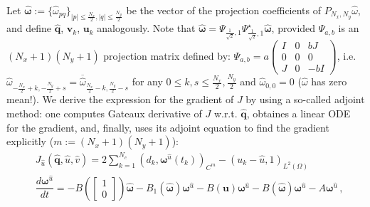 \documentclass[onecolumn, 12pt, conference]{ieeeconf}
\newcommand{\Lt}{L^2(\Omega)}
\begin{document}
Let $\hat{\bm\omega}:=\{\hat\omega_{pq}\}_{|p|\le\frac{N_x}2,|q|\le\frac{N_y}2}$ be the vector of the projection coefficients of $P_{N_x,N_y}\hat\omega$, and define $\hat{\bm q}$, $\bm{v}_k$, $\bm{u}_k$ analogously. Note that $\hat{\bm\omega} = \Psi_{\frac1{\sqrt{2}},1} \Psi_{\frac1{\sqrt{2}},1}^\star\hat{\bm\omega}$, provided $\Psi_{a,b}$ is an $(N_x+1)(N_y+1)$ projection matrix defined by: $\Psi_{a,b}=
a\left( \begin{smallmatrix}
I&0&bJ\\0&0&0\\ J&0&-bI
\end{smallmatrix}
\right)$, i.e. $\hat{\omega}_{-\frac{N_x}2+k,-\frac{N_y}2+s}=\overline{\hat \omega}_{\frac{N_x}2-k,\frac{N_y}2-s}$ for any $0\le k,s\le \frac{N_x}2,\frac{N_y}2$ and $\hat{\omega}_{0,0}=0$ ($\hat\omega$ has zero mean!).
We derive the expression for the gradient of $J$ by using a so-called adjoint method: one computes Gateaux derivative of $J$ w.r.t. $\hat{\bm q}$, obtaines a linear ODE for the gradient, and, finally, uses its adjoint equation to find the gradient explicitly ($m:=(N_x+1)(N_y+1)$):
\[
\begin{split}
&J_{\hat u}(\hat{\bm q},\hat u,\hat v)=2\sum_{k=1}^{N_c} (d_k,\bm{\omega}^{\hat u}(t_k))_{C^m} - (u_k - \hat u,1)_{\Lt} \\
&\dfrac{d\bm{\omega}^{\hat u}}{dt} = -B(\left[\begin{smallmatrix}1\\0
\end{smallmatrix}\right])\hat{\bm\omega}-B_1(\hat{\bm\omega})\bm{\omega}^{\hat u} - B(\bm u) \bm{\omega}^{\hat u}- B(\hat{\bm\omega})\bm{\omega}^{\hat u} - A\bm{\omega}^{\hat u}\,,
\end{split}
\]
\end{document}
